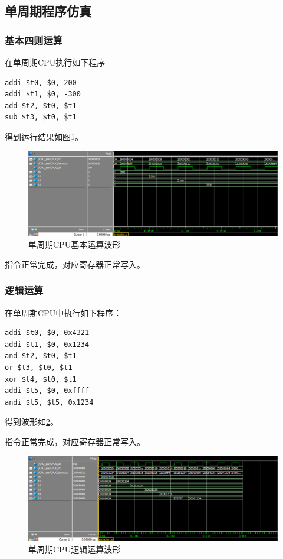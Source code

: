 \documentclass{ctexart}
\begin{document}
	\clearpage

	\subsection{单周期程序仿真}
	\subsubsection{基本四则运算}
	在单周期CPU执行如下程序
	\begin{lstlisting}
addi $t0, $0, 200
addi $t1, $0, -300
add $t2, $t0, $t1
sub $t3, $t0, $t1
	\end{lstlisting}

	得到运行结果如图\ref{simpicture2}。

	\begin{figure}[ht]
		\centering
		\includegraphics[width = \textwidth]{OneCycleTestWave1.eps}
		\caption{单周期CPU基本运算波形}
		\label{simpicture2}
	\end{figure}

	指令正常完成，对应寄存器正常写入。

	\subsubsection{逻辑运算}
	在单周期CPU中执行如下程序：
\begin{lstlisting}
addi $t0, $0, 0x4321
addi $t1, $0, 0x1234
and $t2, $t0, $t1
or $t3, $t0, $t1
xor $t4, $t0, $t1
addi $t5, $0, 0xffff
andi $t5, $t5, 0x1234	
\end{lstlisting}

得到波形如\ref{simpicture3}。

指令正常完成，对应寄存器正常写入。

	\begin{figure}[ht]
		\centering
		\includegraphics[width = \textwidth]{OneCycleTestWave2.eps}
		\caption{单周期CPU逻辑运算波形}
		\label{simpicture3}
	\end{figure}
\end{document}
